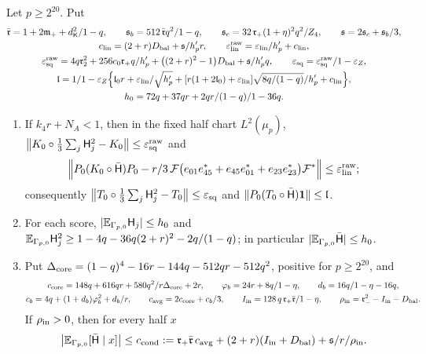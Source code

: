 \begin{lemma}\label{lem:root-normalization}
Let $p\ge2^{20}$. Put
\begin{gather*}
 \bar{\mathfrak r}=\frac{1+2\mathfrak m_++d_{\mathsf K}^2}{1-q},\qquad
 \mathfrak s_b=\frac{512\,\bar{\mathfrak r}q^2}{1-q},\qquad
 \mathfrak s_c=\frac{32\,\mathfrak r_+(1+\eta)^2q^2}{Z_4},\qquad
 \mathfrak s=\frac{2\mathfrak s_c+\mathfrak s_b}3,\\
 c_{\rm lin}=(2+r)D_{\rm bal}+\frac{\mathfrak s}{h'_pr},\qquad
 \eps^{\rm raw}_{\rm lin}=\frac{\eps_{\rm lin}}{h'_p}+c_{\rm lin},\\
 \eps^{\rm raw}_{\rm sq}=\frac{4q\mathfrak r_2^2+256c_0\mathfrak r_+q}{h'_p}
 +\bigl((2+r)^2-1\bigr)D_{\rm bal}+\frac{\mathfrak s}{h'_pq},\qquad
 \eps_{\rm sq}=\frac{\eps^{\rm raw}_{\rm sq}}{1-\eps_Z},\\
 \mathfrak l=\frac1{1-\eps_Z}\Bigl\{\frac{\mathfrak l_0r+\eps_{\rm lin}}{\sqrt{h'_p}}
 +\frac{[r(1+2\mathfrak l_0)+\eps_{\rm lin}]\sqrt{8q/(1-q)}}{h'_p}+c_{\rm lin}\Bigr\},\\
 h_0=\frac{72q+37qr+2qr/(1-q)}{1-36q}.
\end{gather*}
\begin{enumerate}[label=(\alph*)]
\item If $k_4r+N_A<1$, then in the fixed half chart $L^2(\mu_p)$,
 $\bigl\|K_0\circ\tfrac13\sum_j\Hs j^2-K_0\bigr\|\le\eps^{\rm raw}_{\rm sq}$ and
 \[
  \Bigl\|P_0(K_0\circ\Hbar)P_0-\frac r3\,\mathcal F\bigl(e_{01}e_{45}^*+e_{45}e_{01}^*
  +e_{23}e_{23}^*\bigr)\mathcal F^*\Bigr\|\le\eps^{\rm raw}_{\rm lin};
 \]
 consequently $\bigl\|T_0\circ\tfrac13\sum_j\Hs j^2-T_0\bigr\|\le\eps_{\rm sq}$ and
 $\|P_0(T_0\circ\Hbar)\one\|\le\mathfrak l$.
\item For each score, $|\E_{\Gamma_{p,0}}\Hs j|\le h_0$ and
 $\E_{\Gamma_{p,0}}\Hs j^2\ge1-4q-36q(2+r)^2-2q/(1-q)$; in particular
 $|\E_{\Gamma_{p,0}}\Hbar|\le h_0$.
\item Put $\Delta_{\rm core}=(1-q)^4-16r-144q-512qr-512q^2$, positive for $p\ge2^{20}$,
 and
 \begin{gather*}
  c_{\rm core}=\frac{148q+616qr+580q^2}{r\Delta_{\rm core}}+2r,\qquad
  \varphi_b=\frac{24r+8q}{1-\eta},\qquad d_b=\frac{16q}{1-\eta-16q},\\
  c_b=\frac{4q+(1+d_b)\varphi_b^2+d_b}r,\qquad c_{\rm avg}=\frac{2c_{\rm core}+c_b}3,\qquad
  I_{\rm in}=\frac{128\,q\,\mathfrak r_+\bar{\mathfrak r}}{1-\eta},\qquad
  \rho_{\rm in}=\mathfrak r_-^2-I_{\rm in}-D_{\rm bal}.
 \end{gather*}
 If $\rho_{\rm in}>0$, then for every half $x$
 \[
  \bigl|\E_{\Gamma_{p,0}}[\Hbar\mid x]\bigr|\le c_{\rm cond}
  :=\frac{\mathfrak r_+\bar{\mathfrak r}\,c_{\rm avg}+(2+r)(I_{\rm in}+D_{\rm bal})
  +\mathfrak s/r}{\rho_{\rm in}} .
 \]
\end{enumerate}
\end{lemma}


